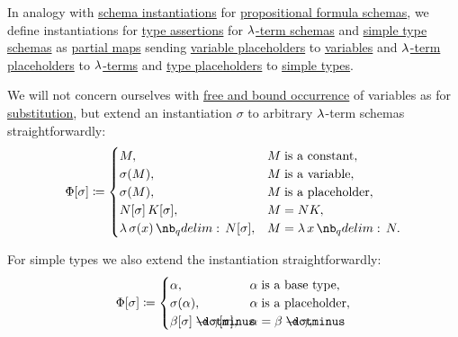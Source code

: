 \begin{definition}\label{def:lambda_schema_instantiation}
  In analogy with \hyperref[def:propositional_schema_instantiation]{schema instantiations} for \hyperref[def:propositional_formula_schema]{propositional formula schemas}, we define instantiations for \hyperref[def:type_assertion]{type assertions} for \hyperref[def:lambda_term_schema]{\( \mathrm{\lambda} \)-term schemas} and \hyperref[def:simple_type_schema]{simple type schemas} as \hyperref[def:set_valued_map/partial]{partial maps} sending \hyperref[def:lambda_term_schema]{variable placeholders} to \hyperref[def:lambda_term]{variables} and \hyperref[def:lambda_term_schema]{\( \mathrm{\lambda} \)-term placeholders} to \hyperref[def:lambda_term]{\( \mathrm{\lambda} \)-terms} and \hyperref[def:simple_type_schema]{type placeholders} to \hyperref[def:simple_type]{simple types}.

  \begin{thmenum}
     We will not concern ourselves with \hyperref[def:lambda_variable_occurrence]{free and bound occurrence} of variables as for \hyperref[def:lambda_term_schema_substitution]{substitution}, but extend an instantiation \( \sigma \) to arbitrary \( \mathrm{\lambda} \)-term schemas straightforwardly:
    \begin{equation}\label{eq:def:lambda_schema_instantiation/terms}
      \Phi[\sigma] \coloneqq \begin{cases}
        M,                               &M \T{is a constant}, \\
        \sigma(M),                       &M \T{is a variable}, \\
        \sigma(M),                       &M \T{is a placeholder}, \\
        N[\sigma] \thinspace K[\sigma],  &M = NK,              \\
        \qabs {\sigma(x)} N[\sigma],     &M = \qabs x N.       \\
      \end{cases}
    \end{equation}

     For simple types we also extend the instantiation straightforwardly:
    \begin{equation}\label{eq:def:lambda_schema_instantiation/types}
      \Phi[\sigma] \coloneqq \begin{cases}
        \alpha,                                   &\alpha \T{is a base type},   \\
        \sigma(\alpha),                           &\alpha \T{is a placeholder}, \\
        \beta[\sigma] \synimplies \gamma[\sigma], &\alpha = \beta \synimplies \gamma,  \\
      \end{cases}
    \end{equation}


\end{thmenum}
\end{definition}
